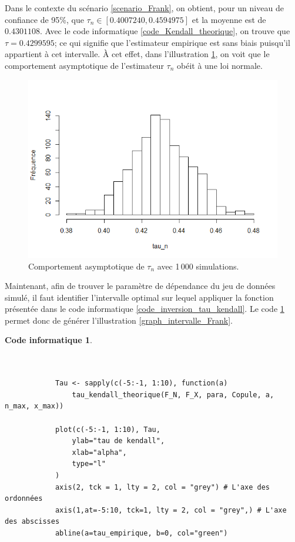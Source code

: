 \documentclass{article}
\newtheorem{code}{Code informatique}
\begin{document}
 	Dans le contexte du scénario \ref{scenario_Frank}, on obtient, pour un niveau de confiance de 95\%, que $\tau_n \in [0.4007240, 0.4594975]$ et la moyenne est de $0.4301108$. Avec le code informatique \ref{code_Kendall_theorique}, on trouve que $\tau = 0.4299595$; ce qui signifie que l'estimateur empirique est sans biais puisqu'il appartient à cet intervalle. À cet effet, dans l'illustration \ref{graph_Tau_n_asymptotique}, on voit que le comportement asymptotique de l'estimateur $\tau_n$ obéit à une loi normale.
 	
 		\begin{figure}[H]
 		\centering
 		\includegraphics[height=8cm]{Graph/Tau_n_asymptotique.png}
 		\caption{Comportement asymptotique de $\tau_n$ avec 1\,000 simulations.} 
 		\label{graph_Tau_n_asymptotique}
 	\end{figure}
 	
 	
 	Maintenant, afin de trouver le paramètre de dépendance du jeu de données simulé, il faut identifier l'intervalle optimal sur lequel appliquer la fonction présentée dans le code informatique \ref{code_inversion_tau_kendall}. Le code \ref{code_graphique_intervalle} permet donc de générer l'illustration \ref{graph_intervalle_Frank}. \\
 	
	 \begin{minipage}[H]{\linewidth}
 	 	 	\begin{code} \label{code_graphique_intervalle}
	 		\begin{verbatim}
	 		
	 		
	 		Tau <- sapply(c(-5:-1, 1:10), function(a)
	 		    tau_kendall_theorique(F_N, F_X, para, Copule, a, n_max, x_max))
	 		
	 		plot(c(-5:-1, 1:10), Tau,
	 		    ylab="tau de kendall",
	 		    xlab="alpha",
	 		    type="l"
	 		)
	 		axis(2, tck = 1, lty = 2, col = "grey") # L'axe des ordonnées
	 		axis(1,at=-5:10, tck=1, lty = 2, col = "grey",) # L'axe des abscisses
	 		abline(a=tau_empirique, b=0, col="green")
	 		\end{verbatim}
 			\end{code}
 	\end{minipage}
\end{document}
